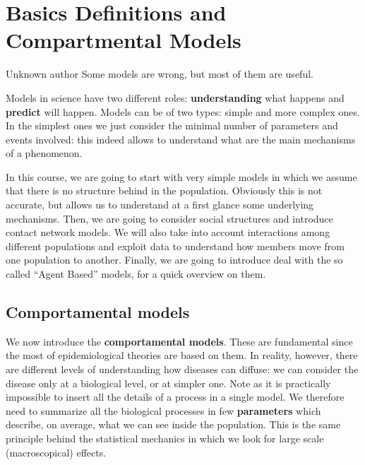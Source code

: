 \documentclass[../main/main.tex]{subfiles}
\begin{document}
\chapter{Basics Definitions and Compartmental Models}

\begin{chapquote}{Unknown author}
Some models are wrong, but most of them are useful.
\end{chapquote}



Models in science have two different roles: \textbf{understanding} what happens and \textbf{predict} will happen.
Models can be of two types: simple and more complex ones. In the simplest ones we just consider the minimal number of parameters and events involved: this indeed allows to understand what are the main mechanisms of a phenomenon.

In this course, we are going to start with very simple models in which we assume that there is no structure behind in the population. Obviously this is not accurate, but allows us to understand at a first glance some underlying mechanisms.
Then, we are going to consider social structures and introduce contact network models. We will also take into account interactions among different populations and exploit data to understand how members move from one population to another. Finally, we are going to introduce deal with the so called “Agent Based” models, for a quick overview on them.

\section{Comportamental models}

We now introduce the \textbf{comportamental models}. These are fundamental since the most of epidemiological theories are based on them. In reality, however, there are different levels of understanding how diseases can diffuse: we can consider the disease only at a biological level, or at simpler one. Note as it is practically impossible to insert all the details of a process in a single model. We therefore need to summarize all the biological processes in few \textbf{parameters} which describe, on average, what we can see inside the population. This is the same principle behind the statistical mechanics in which we look for large scale (macroscopical) effects.
\end{document}
